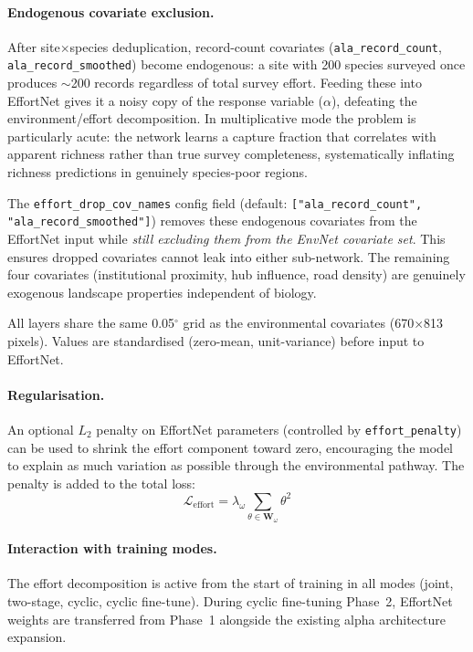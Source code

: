 \documentclass{article}
\begin{document}
\paragraph{Endogenous covariate exclusion.}
After site$\times$species deduplication, record-count covariates (\texttt{ala\_record\_count}, \texttt{ala\_record\_smoothed}) become endogenous: a site with 200 species surveyed once produces $\sim$200 records regardless of total survey effort. Feeding these into EffortNet gives it a noisy copy of the response variable ($\alpha$), defeating the environment/effort decomposition. In multiplicative mode the problem is particularly acute: the network learns a capture fraction that correlates with apparent richness rather than true survey completeness, systematically inflating richness predictions in genuinely species-poor regions.

The \texttt{effort\_drop\_cov\_names} config field (default: \texttt{["ala\_record\_count", "ala\_record\_smoothed"]}) removes these endogenous covariates from the EffortNet input while \emph{still excluding them from the EnvNet covariate set}. This ensures dropped covariates cannot leak into either sub-network. The remaining four covariates (institutional proximity, hub influence, road density) are genuinely exogenous landscape properties independent of biology.

All layers share the same 0.05$^\circ$ grid as the environmental covariates (670$\times$813 pixels). Values are standardised (zero-mean, unit-variance) before input to EffortNet.

\paragraph{Regularisation.}
An optional $L_2$ penalty on EffortNet parameters (controlled by \texttt{effort\_penalty}) can be used to shrink the effort component toward zero, encouraging the model to explain as much variation as possible through the environmental pathway. The penalty is added to the total loss:
\begin{equation}
    \mathcal{L}_{\text{effort}} = \lambda_\omega \sum_{\theta \in \bm{W}_\omega} \theta^2
\end{equation}

\paragraph{Interaction with training modes.}
The effort decomposition is active from the start of training in all modes (joint, two-stage, cyclic, cyclic fine-tune). During cyclic fine-tuning Phase~2, EffortNet weights are transferred from Phase~1 alongside the existing alpha architecture expansion.
\end{document}
